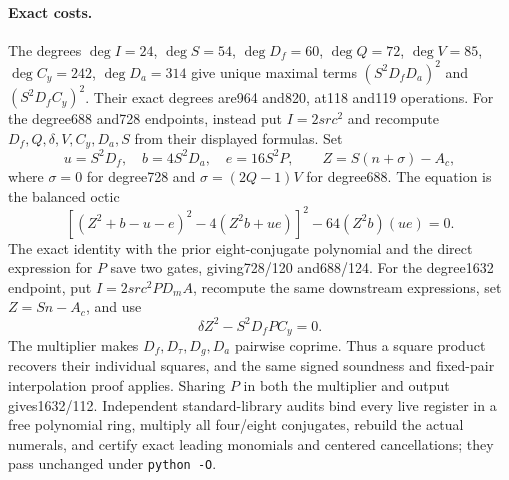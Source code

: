 \paragraph{Exact costs.}
The degrees $\deg I=24$, $\deg S=54$, $\deg D_f=60$,
$\deg Q=72$, $\deg V=85$, $\deg C_y=242$, $\deg D_a=314$
give unique maximal terms $(S^2D_fD_a)^2$ and $(S^2D_fC_y)^2$.
Their exact degrees are964 and820, at118 and119 operations.
For the degree688 and728 endpoints, instead put $I=2src^2$ and
recompute $D_f,Q,\delta,V,C_y,D_a,S$ from their displayed formulas.
Set
\[
 u=S^2D_f,\quad b=4S^2D_a,\quad e=16S^2P,\qquad
 Z=S(n+\sigma)-A_c,
\]
where $\sigma=0$ for degree728 and $\sigma=(2Q-1)V$ for degree688.
The equation is the balanced octic
\[
 [ (Z^2+b-u-e)^2-4(Z^2b+ue)]^2-64(Z^2b)(ue)=0.
\]
The exact identity with the prior eight-conjugate polynomial and the
direct expression for $P$ save two gates, giving728/120 and688/124.
For the degree1632 endpoint, put $I=2src^2PD_mA$, recompute the same
downstream expressions, set $Z=Sn-A_c$, and use
\[
 \delta Z^2-S^2D_fPC_y=0.
\]
The multiplier makes $D_f,D_\tau,D_g,D_a$ pairwise coprime.
Thus a square product recovers their individual squares, and the same
signed soundness and fixed-pair interpolation proof applies.
Sharing $P$ in both the multiplier and output gives1632/112.
Independent standard-library audits bind every live register in a free
polynomial ring, multiply all four/eight conjugates, rebuild the actual
numerals, and certify exact leading monomials and centered cancellations;
they pass unchanged under \texttt{python -O}.
